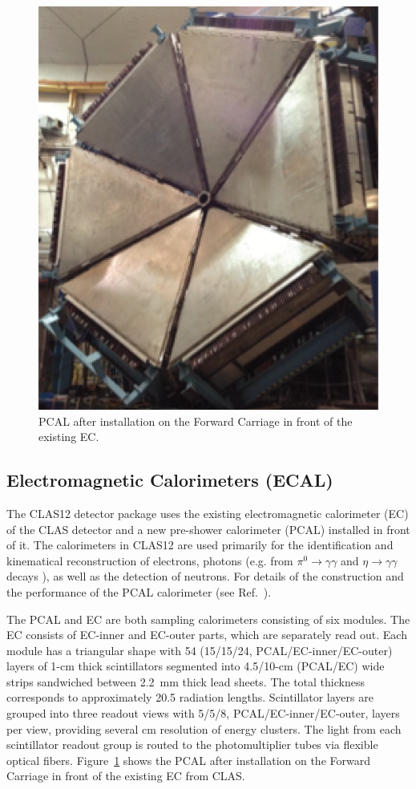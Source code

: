 \documentclass[final,3p,twocolumn]{elsarticle}
\begin{document}
\begin{figure}[htbp!]
\centerline{\includegraphics[width=0.95\columnwidth]{PCAL.png}}
\caption{PCAL after installation on the Forward Carriage in front of the existing EC. }
\label{ec-pcal}
\end{figure}

\subsection{Electromagnetic Calorimeters (ECAL)}

The CLAS12 detector package uses the existing electromagnetic calorimeter (EC) of the CLAS detector
\cite{Amarian:2001zs} and a new pre-shower calorimeter (PCAL) installed in front of it. The calorimeters in
CLAS12 are used primarily for the identification and kinematical reconstruction of electrons, photons (e.g. from
$\pi^0 \to \gamma \gamma$ and $\eta \to \gamma  \gamma$ decays ), as well as the detection of neutrons.
For details of the construction and the performance of the PCAL calorimeter (see Ref.~\cite{PCAL}). 

The PCAL and EC are both sampling calorimeters consisting of six modules. The EC consists of EC-inner and
EC-outer parts, which are separately read out. Each module has a triangular shape with 54 (15/15/24,
PCAL/EC-inner/EC-outer) layers of 1-cm thick scintillators segmented into 4.5/10-cm (PCAL/EC) wide strips
sandwiched between 2.2~mm thick lead sheets. The total thickness corresponds to approximately 20.5 radiation
lengths. Scintillator layers are grouped into three readout views with 5/5/8, PCAL/EC-inner/EC-outer, layers per
view, providing several cm resolution of energy clusters. The light from each scintillator readout group is routed to
the photomultiplier tubes via flexible optical fibers. Figure~\ref{ec-pcal} shows the PCAL after installation on the
Forward Carriage in front of the existing EC from CLAS.
\end{document}
